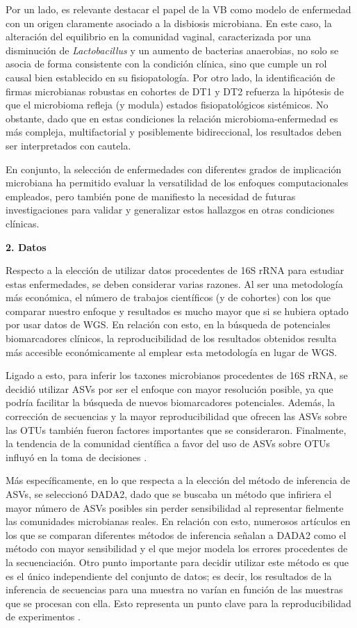 Por un lado, es relevante destacar el papel de la VB como modelo de enfermedad con un origen claramente asociado a la disbiosis microbiana. En este caso, la alteración del equilibrio en la comunidad vaginal, caracterizada por una disminución de \textit{Lactobacillus} y un aumento de bacterias anaerobias, no solo se asocia de forma consistente con la condición clínica, sino que cumple un rol causal bien establecido en su fisiopatología. Por otro lado, la identificación de firmas microbianas robustas en cohortes de DT1 y DT2 refuerza la hipótesis de que el microbioma refleja (y modula) estados fisiopatológicos sistémicos. No obstante, dado que en estas condiciones la relación microbioma-enfermedad es más compleja, multifactorial y posiblemente bidireccional, los resultados deben ser interpretados con cautela.

En conjunto, la selección de enfermedades con diferentes grados de implicación microbiana ha permitido evaluar la versatilidad de los enfoques computacionales empleados, pero también pone de manifiesto la necesidad de futuras investigaciones para validar y generalizar estos hallazgos en otras condiciones clínicas.

\textbf{2. Datos}

Respecto a la elección de utilizar datos procedentes de 16S rRNA para estudiar estas enfermedades, se deben considerar varias razones. Al ser una metodología más económica, el número de trabajos científicos (y de cohortes) con los que comparar nuestro enfoque y resultados es mucho mayor que si se hubiera optado por usar datos de WGS. En relación con esto, en la búsqueda de potenciales biomarcadores clínicos, la reproducibilidad de los resultados obtenidos resulta más accesible económicamente al emplear esta metodología en lugar de WGS.

Ligado a esto, para inferir los taxones microbianos procedentes de 16S rRNA, se decidió utilizar ASVs por ser el enfoque con mayor resolución posible, ya que podría facilitar la búsqueda de nuevos biomarcadores potenciales. Además, la corrección de secuencias y la mayor reproducibilidad que ofrecen las ASVs sobre las OTUs también fueron factores importantes que se consideraron. Finalmente, la tendencia de la comunidad científica a favor del uso de ASVs sobre OTUs influyó en la toma de decisiones \cite{callahan2017exact}.

Más específicamente, en lo que respecta a la elección del método de inferencia de ASVs, se seleccionó DADA2, dado que se buscaba un método que infiriera el mayor número de ASVs posibles sin perder sensibilidad al representar fielmente las comunidades microbianas reales. En relación con esto, numerosos artículos en los que se comparan diferentes métodos de inferencia señalan a DADA2 como el método con mayor sensibilidad y el que mejor modela los errores procedentes de la secuenciación. Otro punto importante para decidir utilizar este método es que es el único independiente del conjunto de datos; es decir, los resultados de la inferencia de secuencias para una muestra no varían en función de las muestras que se procesan con ella. Esto representa un punto clave para la reproducibilidad de experimentos \cite{nearing2018denoising, caruso2019performance, prodan2020comparing}.


